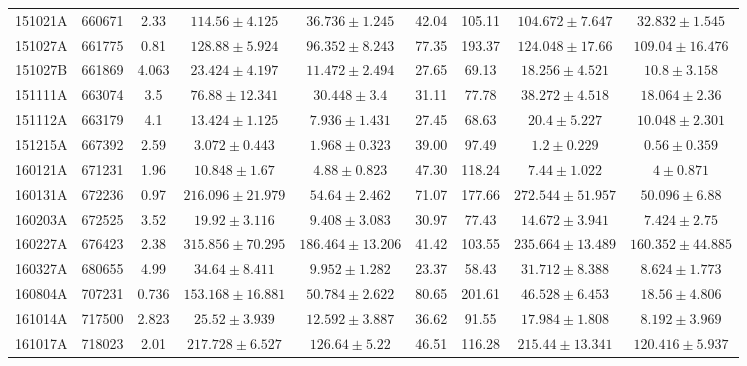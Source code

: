 \documentclass[prd,nofootinbib,preprintnumbers,floatfix]{revtex4}  %
\begin{document}
\begin{center}
\begin{longtable*}{|c|c|c|c|c|c|c|c|c|}
151021A	&	660671	&	2.33	&	$	114.56	\pm	4.125	$	&	$	36.736	\pm	1.245	$	&	42.04	&	105.11	&	$	104.672	\pm	7.647	$	&	$	32.832	\pm	1.545	$	\\
151027A	&	661775	&	0.81	&	$	128.88	\pm	5.924	$	&	$	96.352	\pm	8.243	$	&	77.35	&	193.37	&	$	124.048	\pm	17.66	$	&	$	109.04	\pm	16.476	$	\\
151027B	&	661869	&	4.063	&	$	23.424	\pm	4.197	$	&	$	11.472	\pm	2.494	$	&	27.65	&	69.13	&	$	18.256	\pm	4.521	$	&	$	10.8	\pm	3.158	$	\\
151111A	&	663074	&	3.5	&	$	76.88	\pm	12.341	$	&	$	30.448	\pm	3.4	$	&	31.11	&	77.78	&	$	38.272	\pm	4.518	$	&	$	18.064	\pm	2.36	$	\\
151112A	&	663179	&	4.1	&	$	13.424	\pm	1.125	$	&	$	7.936	\pm	1.431	$	&	27.45	&	68.63	&	$	20.4	\pm	5.227	$	&	$	10.048	\pm	2.301	$	\\
151215A	&	667392	&	2.59	&	$	3.072	\pm	0.443	$	&	$	1.968	\pm	0.323	$	&	39.00	&	97.49	&	$	1.2	\pm	0.229	$	&	$	0.56	\pm	0.359	$	\\
160121A	&	671231	&	1.96	&	$	10.848	\pm	1.67	$	&	$	4.88	\pm	0.823	$	&	47.30	&	118.24	&	$	7.44	\pm	1.022	$	&	$	4	\pm	0.871	$	\\
160131A	&	672236	&	0.97	&	$	216.096	\pm	21.979	$	&	$	54.64	\pm	2.462	$	&	71.07	&	177.66	&	$	272.544	\pm	51.957	$	&	$	50.096	\pm	6.88	$	\\
160203A	&	672525	&	3.52	&	$	19.92	\pm	3.116	$	&	$	9.408	\pm	3.083	$	&	30.97	&	77.43	&	$	14.672	\pm	3.941	$	&	$	7.424	\pm	2.75	$	\\
160227A	&	676423	&	2.38	&	$	315.856	\pm	70.295	$	&	$	186.464	\pm	13.206	$	&	41.42	&	103.55	&	$	235.664	\pm	13.489	$	&	$	160.352	\pm	44.885	$	\\
160327A	&	680655	&	4.99	&	$	34.64	\pm	8.411	$	&	$	9.952	\pm	1.282	$	&	23.37	&	58.43	&	$	31.712	\pm	8.388	$	&	$	8.624	\pm	1.773	$	\\
160804A	&	707231	&	0.736	&	$	153.168	\pm	16.881	$	&	$	50.784	\pm	2.622	$	&	80.65	&	201.61	&	$	46.528	\pm	6.453	$	&	$	18.56	\pm	4.806	$	\\
161014A	&	717500	&	2.823	&	$	25.52	\pm	3.939	$	&	$	12.592	\pm	3.887	$	&	36.62	&	91.55	&	$	17.984	\pm	1.808	$	&	$	8.192	\pm	3.969	$	\\
161017A	&	718023	&	2.01	&	$	217.728	\pm	6.527	$	&	$	126.64	\pm	5.22	$	&	46.51	&	116.28	&	$	215.44	\pm	13.341	$	&	$	120.416	\pm	5.937	$	\\

\end{longtable*}
\end{center}
\end{document}
